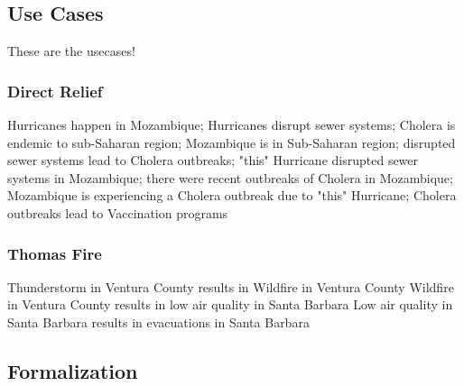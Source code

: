 \subsection{Use Cases}
\label{ssec:use-cases}
These are the usecases!

\subsubsection{Direct Relief}
Hurricanes happen in Mozambique; Hurricanes disrupt sewer systems; Cholera is endemic to sub-Saharan region; Mozambique is in Sub-Saharan region; disrupted sewer systems lead to Cholera outbreaks; "this" Hurricane disrupted sewer systems in Mozambique; there were recent outbreaks of Cholera in Mozambique; Mozambique is experiencing a Cholera outbreak due to "this" Hurricane; Cholera outbreaks lead to Vaccination programs

\subsubsection{Thomas Fire}
Thunderstorm in Ventura County results in Wildfire in Ventura County
Wildfire in Ventura County results in low air quality in Santa Barbara
Low air quality in Santa Barbara results in evacuations in Santa Barbara



\subsection{Formalization}
\label{ssec:formalization}
